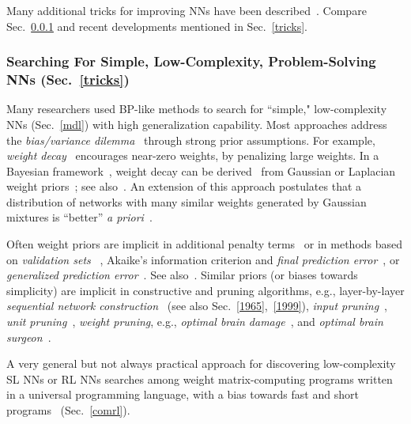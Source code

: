 \documentclass[letterpaper]{article}
\begin{document}
\begin{CJK*}{UTF8}{gbsn}
\begin{sloppypar}
Many additional tricks for improving NNs have been described~\citep[e.g.,][]{orr1998neural,tricksofthetrade:2012}.
Compare Sec.~\ref{mdlnn} and recent developments mentioned in Sec.~\ref{tricks}. 

\subsubsection{Searching For Simple, Low-Complexity, Problem-Solving NNs (Sec.~\ref{tricks})}
\label{mdlnn}


Many researchers used BP-like methods to search for
``simple," low-complexity NNs (Sec.~\ref{mdl})
with high generalization capability. Most approaches 
address the {\em bias/variance dilemma}~\citep{Geman:92}
through strong prior 
assumptions. For example, 
{\em weight decay}~\citep{Hanson:89,Weigend:91,Krogh:92} 
encourages near-zero weights, by penalizing large weights. In a Bayesian
framework~\citep{bayes1763}, weight decay can be derived~\citep{Hinton:93} 
from Gaussian or Laplacian weight priors~\citep{gauss1809,laplace1774}; 
see also~\citep{Murray:93}. 
An extension of this approach
postulates that 
a distribution of networks
with many similar weights 
generated by Gaussian mixtures is ``better'' {\em a priori}~\citep{Nowlan:92}.

Often weight priors  are implicit in
additional penalty terms~\citep{MacKay:92b} or
 in methods based on {\em validation sets}
~\citep{Mosteller:68,Stone:74,Eubank:88,Hastie:90,Craven:79,Golub:79},
Akaike's information criterion and
 {\em final prediction error}~\citep{Akaike:70,akaike1973,akaike1974}, or
{\em generalized prediction error}~\citep{Moody:94a,Moody:92}.
See also~\citep{Holden:94,Wang:94,Amari:93,Wang:94,Vapnik:92a,Vapnik:92,Wolpert:94b}.
Similar priors (or biases towards simplicity) are implicit in  constructive and pruning algorithms,
e.g., layer-by-layer 
 {\em sequential network construction}~\citep[e.g.,][]{ivakhnenko1968,ivakhnenko1971,Ash:89,Moody:89,gallant1988,honavar1988,Ring:91,Fahlman:91,weng1992,honavar1993,burgess1994,fritzke94,parekh2000,utgoff2002} (see also Sec.~\ref{1965},~\ref{1999}),
{\em input pruning}~\citep{Moody:92,Refenes:94},
{\em unit pruning}~\citep[e.g.,][]{ivakhnenko1968,ivakhnenko1971,White:89,Mozer:89a,Levin:94},
{\em weight pruning}, e.g., {\em optimal brain damage}~\citep{LeCun:90a},
and {\em optimal brain surgeon}~\citep{Hassibi:93}. 

A very general but not always practical
approach for discovering low-complexity SL NNs or RL NNs searches among weight matrix-computing programs written in a universal programming language, with a bias
towards fast and short programs~\citep{Schmidhuber:97nn+} (Sec.~\ref{comrl}).


\end{sloppypar}
\end{CJK*}
\end{document}
